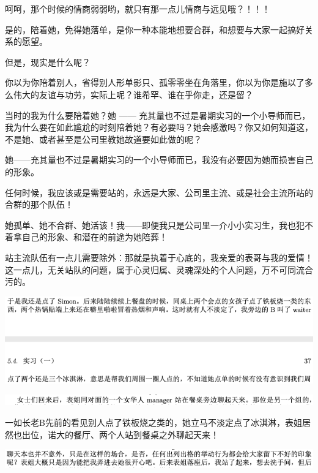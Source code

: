\documentclass[9pt, b5paper]{article}
\begin{document}
呵呵，那个时候的情商弱弱哟，就只有那一点儿情商与远见哦？！！！

是的，陪着她，免得她落单，是你一种本能地想要合群，和想要与大家一起搞好关系的愿望。

但是，现实是什么呢？

你以为你陪着别人，省得别人形单影只、孤零零坐在角落里，你以为你是施以了多么伟大的友谊与功劳，实际上呢？谁希罕、谁在乎你走，还是留？

当时的我为什么要陪着她？她 —— 充其量也不过是暑期实习的一个小导师而已，我为什么要在如此尴尬的时刻陪着她？有必要吗？她会感激吗？你又如何知道这，不是她、或者甚至是公司里教她故道要如此做的呢？

她——充其量也不过是暑期实习的一个小导师而已，我没有必要因为她而损害自己的形象。

任何时候，我应该或是需要站的，永远是大家、公司里主流、或是社会主流所站的合群的那个队伍！

她孤单、她不合群、她活该！我——即便我只是公司里一介小小实习生，我也犯不着拿自己的形象、和潜在的前途为她陪葬！

站主流队伍有一点儿需要除外：那就是执着于心底的，我亲爱的表哥与我的爱情！这一点儿，无关站队的问题，属于心灵归属、灵魂深处的个人问题，万不可同流合污的。

\begin{center}
\includegraphics[width=.9\linewidth]{./pic/backups_plans_20210505_110209.png}
\end{center}

\begin{center}
\includegraphics[width=.9\linewidth]{./pic/backups_plans_20210504_215114.png}
\end{center}

一如长老B先前的看见别人点了铁板烧之类的，她立马不淡定点了冰淇淋，表姐居然也出位，诺大的餐厅、两个人站到餐桌之外聊起天来！

\begin{center}
\includegraphics[width=.9\linewidth]{./pic/backups_plans_20210504_215123.png}
\end{center}
\end{document}
